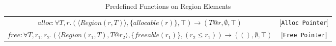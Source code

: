 \documentclass{article}
\newcommand{\rtriple}[3]{\left({#1},{#2},{#3}\right)}
\newcommand{\rsingle}[1]{\rtriple{#1}{\emptyset}{\top}}
\begin{document}
\begin{table*}
{\begin{tabular}{cc}
%
%
\begin{math}
alloc : \forall T,r. \rtriple{\langle Region(r,T) \rangle}{\{ allocable(r) \}}{\top} \rightarrow \rsingle{T@r}
\end{math} & [{\tt Alloc Pointer}] \\

%
%
\begin{math}
free : \forall T,r_1,r_2. \rtriple{\langle Region(r_1,T), T@r_2 \rangle}{\{ freeable(r_1) \}}{(r_2 \le r_1)} \rightarrow \rsingle{()}
\end{math} & [{\tt Free Pointer}]
\end{tabular}
}
\caption{Predefined Functions on Region Elements}
\end{table*}
\end{document}

